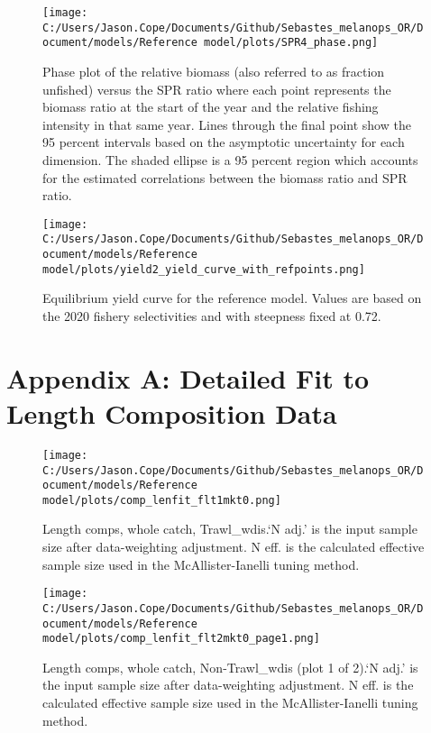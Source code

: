 \documentclass[11pt,
  english,
  letterpaper,
]{article}
\begin{document}
\clearpage

\begin{figure}
\centering
\texttt{[image: C:/Users/Jason.Cope/Documents/Github/Sebastes\_melanops\_OR/Document/models/Reference model/plots/SPR4\_phase.png]}
\caption{Phase plot of the relative biomass (also referred to as fraction unfished) versus the SPR ratio where each point represents the biomass ratio at the start of the year and the relative fishing intensity in that same year. Lines through the final point show the 95 percent intervals based on the asymptotic uncertainty for each dimension. The shaded ellipse is a 95 percent region which accounts for the estimated correlations between the biomass ratio and SPR ratio.\label{fig:phase}}
\end{figure}

\begin{figure}
\centering
\texttt{[image: C:/Users/Jason.Cope/Documents/Github/Sebastes\_melanops\_OR/Document/models/Reference model/plots/yield2\_yield\_curve\_with\_refpoints.png]}
\caption{Equilibrium yield curve for the reference model. Values are based on the 2020 fishery selectivities and with steepness fixed at 0.72.\label{fig:yield}}
\end{figure}

\clearpage

\hypertarget{app-a}{%
\section{Appendix A: Detailed Fit to Length Composition Data}\label{app-a}}

\begin{figure}
\centering
\texttt{[image: C:/Users/Jason.Cope/Documents/Github/Sebastes\_melanops\_OR/Document/models/Reference model/plots/comp\_lenfit\_flt1mkt0.png]}
\caption{Length comps, whole catch, Trawl\_wdis.`N adj.' is the input sample size after data-weighting adjustment. N eff. is the calculated effective sample size used in the McAllister-Ianelli tuning method.\label{fig:comp_lenfit_flt1mkt0}}
\end{figure}

\begin{figure}
\centering
\texttt{[image: C:/Users/Jason.Cope/Documents/Github/Sebastes\_melanops\_OR/Document/models/Reference model/plots/comp\_lenfit\_flt2mkt0\_page1.png]}
\caption{Length comps, whole catch, Non-Trawl\_wdis (plot 1 of 2).`N adj.' is the input sample size after data-weighting adjustment. N eff. is the calculated effective sample size used in the McAllister-Ianelli tuning method.\label{fig:comp_lenfit_flt2mkt0_page1}}
\end{figure}
\end{document}
